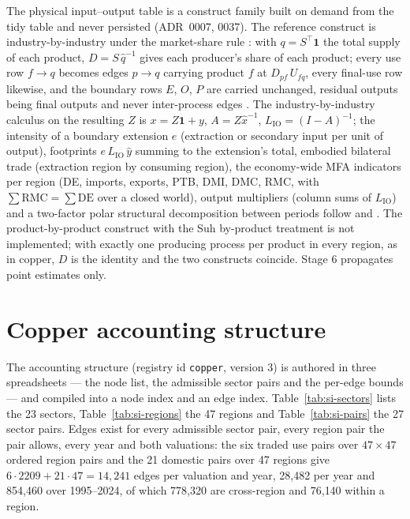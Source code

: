 \documentclass[11pt]{article}
\begin{document}
The physical input--output table is a construct family built on demand from
the tidy table and never persisted (ADR~0007, 0037). The reference
construct is industry-by-industry under the market-share rule
\citep{millerblair2009}: with $q = S^\top \mathbf{1}$ the total supply of each
product, $D = S\,\hat{q}^{-1}$ gives each producer's share of each product;
every use row $f \to q$ becomes edges $p \to q$ carrying product $f$ at
$D_{pf}\,U_{fq}$, every final-use row likewise, and the boundary rows $E$,
$O$, $P$ are carried unchanged, residual outputs being final outputs and
never inter-process edges \citep{altimirasmartin2014piot}. The
industry-by-industry calculus on the resulting $Z$ is $x = Z\mathbf{1} + y$,
$A = Z\hat{x}^{-1}$, $L_{\mathrm{IO}} = (I - A)^{-1}$; the intensity of a
boundary extension $e$ (extraction or secondary input per unit of output),
footprints $e\,L_{\mathrm{IO}}\,\hat{y}$ summing to the extension's total,
embodied bilateral trade (extraction region by consuming region), the
economy-wide MFA indicators per region (DE, imports, exports, PTB, DMI, DMC,
RMC, with $\sum \mathrm{RMC} = \sum \mathrm{DE}$ over a closed world),
output multipliers (column sums of $L_{\mathrm{IO}}$) and a two-factor polar
structural decomposition between periods follow \citet{wieland2022piolab}
and \citet{suh2004pio}. The product-by-product construct with the Suh
by-product treatment is not implemented; with exactly one producing process
per product in every region, as in copper, $D$ is the identity and the two
constructs coincide. Stage 6 propagates point estimates only.

\section{Copper accounting structure}\label{si:structure}

The accounting structure (registry id \texttt{copper}, version 3) is
authored in three spreadsheets --- the node list, the admissible sector
pairs and the per-edge bounds --- and compiled into a node index and an edge
index. Table~\ref{tab:si-sectors} lists the 23 sectors,
Table~\ref{tab:si-regions} the 47 regions and Table~\ref{tab:si-pairs} the
27 sector pairs. Edges exist for every admissible sector pair, every region
pair the pair allows, every year and both valuations: the six traded use
pairs over $47 \times 47$ ordered region pairs and the 21 domestic pairs
over 47 regions give $6 \cdot 2209 + 21 \cdot 47 = 14{,}241$ edges per
valuation and year, 28{,}482 per year and 854{,}460 over 1995--2024, of which
778{,}320 are cross-region and 76{,}140 within a region.
\end{document}
